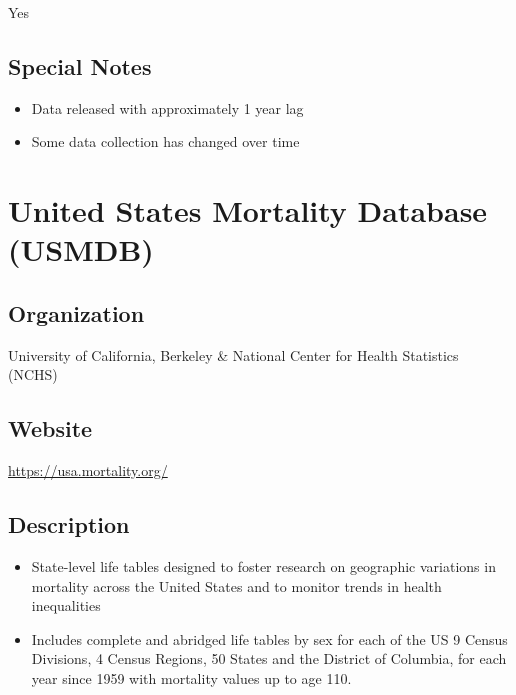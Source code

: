 \documentclass[
]{book}
\providecommand{\tightlist}{%
  \setlength{\itemsep}{0pt}\setlength{\parskip}{0pt}}
\begin{document}
Yes

\hypertarget{special-notes-91}{%
\section{Special Notes}\label{special-notes-91}}

\begin{itemize}
\tightlist
\item
  Data released with approximately 1 year lag
\item
  Some data collection has changed over time
\end{itemize}

\mainmatter

\hypertarget{united-states-mortality-database-usmdb}{%
\chapter{United States Mortality Database (USMDB)}\label{united-states-mortality-database-usmdb}}

\hypertarget{organization-92}{%
\section{Organization}\label{organization-92}}

University of California, Berkeley \& National Center for Health Statistics (NCHS)

\hypertarget{website-92}{%
\section{Website}\label{website-92}}

\url{https://usa.mortality.org/}

\hypertarget{description-92}{%
\section{Description}\label{description-92}}

\begin{itemize}
\tightlist
\item
  State-level life tables designed to foster research on geographic variations in mortality across the United States and to monitor trends in health inequalities
\item
  Includes complete and abridged life tables by sex for each of the US 9 Census Divisions, 4 Census Regions, 50 States and the District of Columbia, for each year since 1959 with mortality values up to age 110.
\end{itemize}
\end{document}
